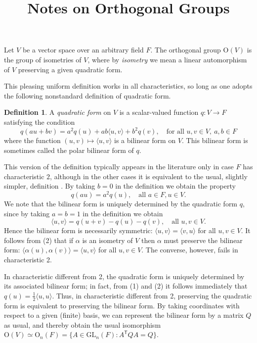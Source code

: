\documentclass[12pt,oneside]{amsart}
\theoremstyle{definition}
\newtheorem*{defn*}{Definition}
\theoremstyle{remark}
\newcommand{\GL}{\mathrm{GL}}
\renewcommand{\O}{\mathrm{O}}
\newcommand{\transpose}{\mathsf{T}}
\newcommand{\inner}[2]{\langle #1, #2 \rangle}
\begin{document}
\title{Notes on Orthogonal Groups}
\author{} \maketitle

\noindent
Let $V$ be a vector space over an arbitrary field $F$.  The orthogonal
group $\O(V)$ is the group of isometries of $V$, where by
\emph{isometry} we mean a linear automorphism of $V$ preserving a
given quadratic form.

This pleasing uniform definition works in all characteristics, so long
as one adopts the following nonstandard definition of quadratic form.

\begin{defn*}
  A \emph{quadratic form} on $V$ is a scalar-valued function $q \colon
  V \to F$ satisfying the condition
  \[
    q( a u + b v ) = a^2 q(u) + ab\inner{u}{v} + b^2 q(v),
    \quad\text{for all } u,v \in V,\ a,b \in F
  \]
  where the function $(u,v) \mapsto \inner{u}{v}$ is a bilinear form
  on $V$. This bilinear form is sometimes called the polar bilinear
  form of $q$.
\end{defn*}

This version of the definition typically appears in the literature
only in case $F$ has characteristic $2$, although in the other cases
it is equivalent to the usual, slightly simpler, definition
\cite{Artin, Carter, Grove}.  By taking $b = 0$ in the definition we
obtain the property
\[ \tag{1}
  q(au) = a^2 q(u), \quad \text{all } a \in F, u \in V.
\]
We note that the bilinear form is uniquely determined by the quadratic
form $q$, since by taking $a=b=1$ in the definition we obtain
\[ \tag{2}
  \inner{u}{v} = q(u+v) - q(u) - q(v), \quad\text{all } u,v \in V.
\]
Hence the bilinear form is necessarily symmetric: $\inner{u}{v} =
\inner{v}{u}$ for all $u,v \in V$.  It follows from (2) that if
$\alpha$ is an isometry of $V$ then $\alpha$ must preserve the
bilinear form: $\inner{\alpha(u)}{\alpha(v)} = \inner{u}{v}$ for all
$u,v \in V$. The converse, however, fails in characteristic 2.


In characteristic different from 2, the quadratic form is uniquely
determined by its associated bilinear form; in fact, from (1) and (2)
it follows immediately that $q(u) = \frac{1}{2}\inner{u}{u}$. Thus, in
characteristic different from 2, preserving the quadratic form is
equivalent to preserving the bilinear form. By taking coordinates with
respect to a given (finite) basis, we can represent the bilinear form
by a matrix $Q$ as usual, and thereby obtain the usual isomorphism
$\O(V) \simeq \O_n(F) = \{ A \in \GL_n(F) \colon A^\transpose Q A = Q
\}$. 
\end{document}
